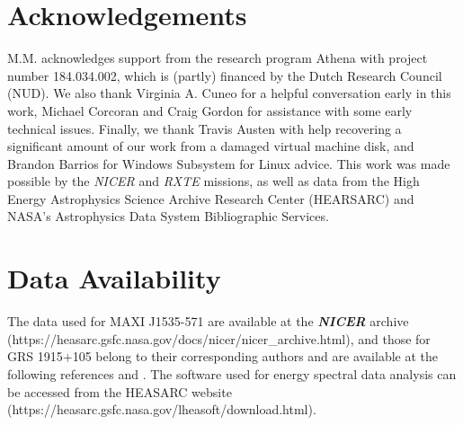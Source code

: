 \documentclass[fleqn,usenatbib,twocolumn]{mnras}%
\begin{document}



\section{Acknowledgements}

M.M. acknowledges support from the research program Athena with project number 184.034.002, which is (partly) financed by the Dutch Research Council (NUD). We also thank Virginia A. Cuneo for a helpful conversation early in this work, Michael Corcoran and Craig Gordon for assistance with some early technical issues. Finally, we thank Travis Austen with help recovering a significant amount of our work from a damaged virtual machine disk, and Brandon Barrios for Windows Subsystem for Linux advice. This work was made possible by the \textit{NICER} and \textit{RXTE} missions, as well as data from the High Energy Astrophysics Science Archive Research Center (HEARSARC) and NASA's Astrophysics Data System Bibliographic Services. 

\section{Data Availability}
The data used for MAXI J1535-571 are available at the \textbf{\textit{NICER}} archive (https://heasarc.gsfc.nasa.gov/docs/nicer/nicer\_archive.html), and those for
GRS 1915+105 belong to their corresponding authors and are available at the following references \cite{GRSDATAPAPER} and \cite{zhangGRS2022}. The software used for energy spectral data analysis can be accessed from the HEASARC website
(https://heasarc.gsfc.nasa.gov/lheasoft/download.html). \\
\end{document}
